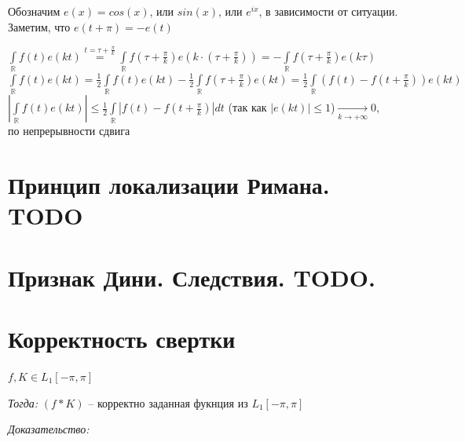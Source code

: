 \documentclass[paper=a4, fontsize=17pt]{article}
\begin{document}
Обозначим $e(x) = cos(x)$, или $sin(x)$, или $e^{ix}$, в зависимости от ситуации. Заметим, что $e(t + \pi) = -e(t)$

$\int\limits_{\mathds{R}}f(t)e(kt)  {\overset{t=\tau + \frac{\pi}{k}}{=}} \int\limits_{\mathds{R}}f(\tau + \frac{\pi}{k})e(k \cdot (\tau + \frac{\pi}{k})) = -\int\limits_{\mathds{R}}f(\tau + \frac{\pi}{k})e(k \tau)$ \\
$\int\limits_{\mathds{R}}f(t)e(kt) = \frac{1}{2}\int\limits_{\mathds{R}}f(t)e(kt) - \frac{1}{2}\int\limits_{\mathds{R}}f(\tau + \frac{\pi}{k})e(kt) = \frac{1}{2}\int\limits_{\mathds{R}}(f(t) - f(t + \frac{\pi}{k})) e(kt)$ \\

$|\int\limits_{\mathds{R}}f(t)e(kt)| \leq\frac{1}{2}\int\limits_{\mathds{R}}|f(t) - f(t + \frac{\pi}{k})|dt$ (так как $|e(kt)| \leq 1$)$ \xrightarrow[k \to +\infty]{}0$,\\по непрерывности сдвига

\section{Принцип локализации Римана. TODO}

\section{Признак Дини. Следствия. TODO.}

\section{Корректность свертки}

$ f, K \in L_1[-\pi, \pi] $

\emph{Тогда:} $ (f * K)$ -- корректно заданная фукнция из $ L_1[-\pi, \pi] $

\emph{Доказательство:}
\end{document}

